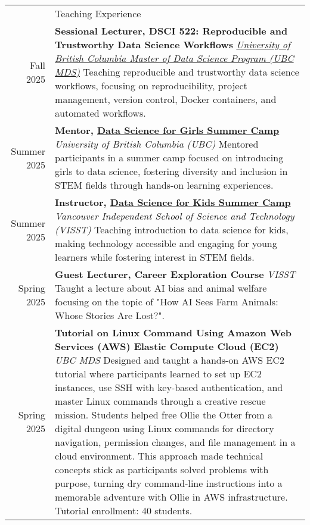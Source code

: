 \documentclass[letterpaper, 11pt]{article}
\newcommand{\headingfont}{\Large\color{OliveGreen}}
\newenvironment{SectionTable}[1]{
	\renewcommand*{\arraystretch}{1.7}
	\setlength{\tabcolsep}{10pt}
	\begin{longtable}{Rp{5.2in}} & #1 \\}
{\end{longtable}\vspace{-.3cm}}
\begin{document}
\begin{SectionTable}{\headingfont Teaching Experience}
Fall 2025 & 
\textbf{Sessional Lecturer, DSCI 522: Reproducible and Trustworthy Data Science Workflows} \newline 
\textit{\href{https://ubc-mds.github.io/descriptions/}{University of British Columbia Master of Data Science Program (UBC MDS)}}\newline
Teaching reproducible and trustworthy data science workflows, focusing on reproducibility, project management, version control, Docker containers, and automated workflows. \\
Summer 2025 & 
\textbf{Mentor, \href{https://katieburak.github.io/girls-in-DS/README.html}{Data Science for Girls Summer Camp}} \newline 
\textit{University of British Columbia (UBC)}\newline
Mentored participants in a summer camp focused on introducing girls to data science, fostering diversity and inclusion in STEM fields through hands-on learning experiences. \\
Summer 2025 & 
\textbf{Instructor, \href{https://www.visst.ca/camps/datascience}{Data Science for Kids Summer Camp}} \newline 
\textit{Vancouver Independent School of Science and Technology (VISST)}\newline
Teaching introduction to data science for kids, making technology accessible and engaging for young learners while fostering interest in STEM fields. \\
Spring 2025 & 
\textbf{Guest Lecturer, Career Exploration Course} \newline 
\textit{VISST}\newline
Taught a lecture about AI bias and animal welfare focusing on the topic of "How AI Sees Farm Animals: Whose Stories Are Lost?". \\
Spring 2025 & 
\textbf{Tutorial on Linux Command Using Amazon Web Services (AWS) Elastic Compute Cloud (EC2)} \newline 
\textit{UBC MDS}\newline
Designed and taught a hands-on AWS EC2 tutorial where participants learned to set up EC2 instances, use SSH with key-based authentication, and master Linux commands through a creative rescue mission. Students helped free Ollie the Otter from a digital dungeon using Linux commands for directory navigation, permission changes, and file management in a cloud environment. This approach made technical concepts stick as participants solved problems with purpose, turning dry command-line instructions into a memorable adventure with Ollie in AWS infrastructure. Tutorial enrollment: 40 students. \\

\end{SectionTable}
\end{document}

